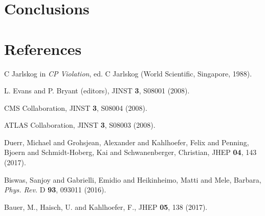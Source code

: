 \documentclass{moriond}
\def\Journal#1#2#3#4{{#1} {\bf #2}, #3 (#4)}
\def\PRD{{\em Phys. Rev.} D}
\def\JINST{JINST}
\def\JHEP{JHEP}
\begin{document}
\section{Conclusions}



\section*{References}

\begin{thebibliography}{99}
C Jarlskog in {\em CP Violation}, ed. C Jarlskog
(World Scientific, Singapore, 1988).

L. Evans and P. Bryant (editors), \Journal{\JINST}{3}{S08001}{2008}.

CMS Collaboration, \Journal{\JINST}{3}{S08004}{2008}.

ATLAS Collaboration, \Journal{\JINST}{3}{S08003}{2008}.

Duerr, Michael and Grohsjean, Alexander and Kahlhoefer, Felix and Penning, Bjoern and Schmidt-Hoberg, Kai and Schwanenberger, Christian, \Journal{\JHEP}{04}{143}{2017}.

Biswas, Sanjoy and Gabrielli, Emidio and Heikinheimo, Matti and Mele, Barbara, \Journal{\PRD}{93}{093011}{2016}.

Bauer, M., Haisch, U. and Kahlhoefer, F., \Journal{\JHEP}{05}{138}{2017}.

\end{thebibliography}
\end{document}
